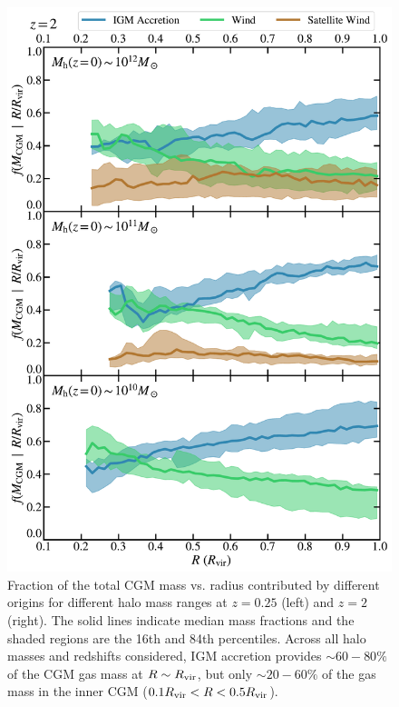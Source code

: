 \documentclass[fleqn,usenatbib]{mnras}
\begin{document}
\begin{figure}
\begin{minipage}{0.495\textwidth}
\includegraphics[width=\textwidth]{figures/CGM_fraction_profile_snum172.pdf}
\end{minipage} \hfill
\caption{
Fraction of the total CGM mass vs. radius contributed by different origins for different halo mass ranges at $z=0.25$ (left) and $z=2$ (right).
The solid lines indicate median mass fractions and the shaded regions are the 16th and 84th percentiles. 
Across all halo masses and redshifts considered, IGM accretion provides $\sim 60-80\%$ of the CGM gas mass at $R \sim R_{\rm vir}$, but only $\sim 20-60\%$ of the gas mass in the inner CGM ($0.1R_{\rm vir}<R<0.5R_{\rm vir}$).
}
\label{fig:CGM_mass_frac_profile}
\end{figure}
\end{document}
